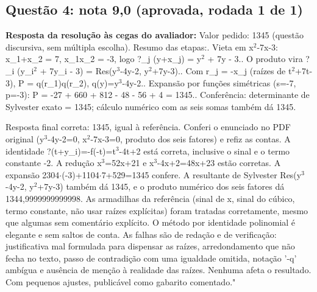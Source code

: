 \documentclass{article}%
\begin{document}
\subsection*{Questão 4: nota 9,0 (aprovada, rodada 1 de 1)}%
\textbf{Resposta da resolução às cegas do avaliador:} Valor pedido: 1345 (questão discursiva, sem múltipla escolha).\newline%
\newline%
Resumo das etapas:. Vieta em x$^2$-7x-3: x\_1+x\_2 = 7, x\_1x\_2 = -3, logo ?\_j (y+x\_j) = y$^2$ + 7y - 3.. O produto vira ?\_i (y\_i$^2$ + 7y\_i - 3) = Res(y$^3$-4y-2, y$^2$+7y-3).. Com r\_j = -x\_j (raízes de t$^2$+7t-3), P = q(r\_1)q(r\_2), q(y)=y$^3$-4y-2.. Expansão por funções simétricas (s=-7, p=-3): P = -27 + 660 + 812 - 48 - 56 + 4 = 1345.. Conferência: determinante de Sylvester exato = 1345; cálculo numérico com as seis somas também dá 1345.\par %
Resposta final correta: 1345, igual à referência. Conferi o enunciado no PDF original (y$^3$-4y-2=0, x$^2$-7x-3=0, produto dos seis fatores) e refiz as contas. A identidade ?(t+y\_i)=-f(-t)=t$^3$-4t+2 está correta, inclusive o sinal e o termo constante -2. A redução x$^3$=52x+21 e x$^3$-4x+2=48x+23 estão corretas. A expansão 2304$\cdot$(-3)+1104$\cdot$7+529=1345 confere. A resultante de Sylvester Res(y$^3$-4y-2, y$^2$+7y-3) também dá 1345, e o produto numérico dos seis fatores dá 1344,9999999999998. As armadilhas da referência (sinal de x, sinal do cúbico, termo constante, não usar raízes explícitas) foram tratadas corretamente, mesmo que algumas sem comentário explícito. O método por identidade polinomial é elegante e sem saltos de conta. As falhas são de redação e de verificação: justificativa mal formulada para dispensar as raízes, arredondamento que não fecha no texto, passo de contradição com uma igualdade omitida, notação '-q' ambígua e ausência de menção à realidade das raízes. Nenhuma afeta o resultado. Com pequenos ajustes, publicável como gabarito comentado."%
\end{document}
